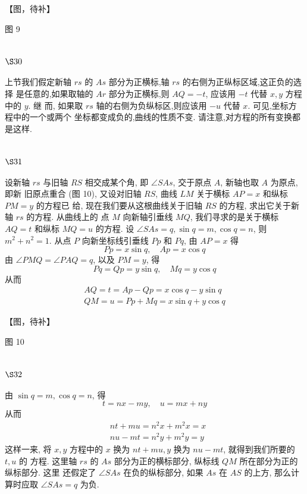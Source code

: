 【图，待补】

图 9

\section{$\S 30$}

上节我们假定新轴 $r s$ 的 $A s$ 部分为正横标,轴 $r s$ 的右侧为正纵标区域,这正负的选择 是任意的,如果取轴的 $A r$ 部分为正横标,则 $A Q=-t$, 应该用 $-t$ 代替 $x, y$ 方程中的 $y$. 继 而, 如果取 $r s$ 轴的右侧为负纵标区,则应该用 $-u$ 代替 $x$. 可见,坐标方程中的一个或两个 坐标都变成负的,曲线的性质不变. 请注意,对方程的所有变换都是这样. 

\section{$\S 31$}

设新轴 $r s$ 与旧轴 $R S$ 相交成某个角, 即 $\angle S A s$, 交于原点 $A$, 新轴也取 $A$ 为原点, 即新 旧原点重合 (图 10), 又设对旧轴 $R S$, 曲线 $L M$ 关于横标 $A P=x$ 和纵标 $P M=y$ 的方程已 给, 现在我们要从这根曲线关于旧轴 $R S$ 的方程, 求出它关于新轴 $r s$ 的方程. 从曲线上的 点 $M$ 向新轴引垂线 $M Q$, 我们寻求的是关于横标 $A Q=t$ 和纵标 $M Q=u$ 的方程. 设 $\angle S A s=q, \sin q=m, \cos q=n$, 则 $m^{2}+n^{2}=1$. 从点 $P$ 向新坐标线引垂线 $P p$ 和 $P q$, 由 $A P=x$ 得
\[
P p=x \sin q, \quad A p=x \cos q
\]
由 $\angle P M Q=\angle P A Q=q$, 以及 $P M=y$, 得
\[
P q=Q p=y \sin q, \quad M q=y \cos q
\]
从而
\[
\begin{gathered}
A Q=t=A p-Q p=x \cos q-y \sin q \\
Q M=u=P p+M q=x \sin q+y \cos q
\end{gathered}
\]

【图，待补】

图 10

\section{$\S 32$}

由 $\sin q=m, \cos q=n$, 得
\[
t=n x-m y, \quad u=m x+n y
\]
从而
\[
\begin{aligned}
& n t+m u=n^{2} x+m^{2} x=x \\
& n u-m t=n^{2} y+m^{2} y=y
\end{aligned}
\]
这样一来, 将 $x, y$ 方程中的 $x$ 换为 $n t+m u, y$ 换为 $n u-m t$, 就得到我们所要的 $t, u$ 的 方程. 这里轴 $r s$ 的 $A s$ 部分为正的横标部分, 纵标线 $Q M$ 所在部分为正的纵标部分. 这里 还假定了 $\angle S A s$ 在负的纵标部分, 如果 $A s$ 在 $A S$ 的上方, 那么计算时应取 $\angle S A s=q$ 为负. 

